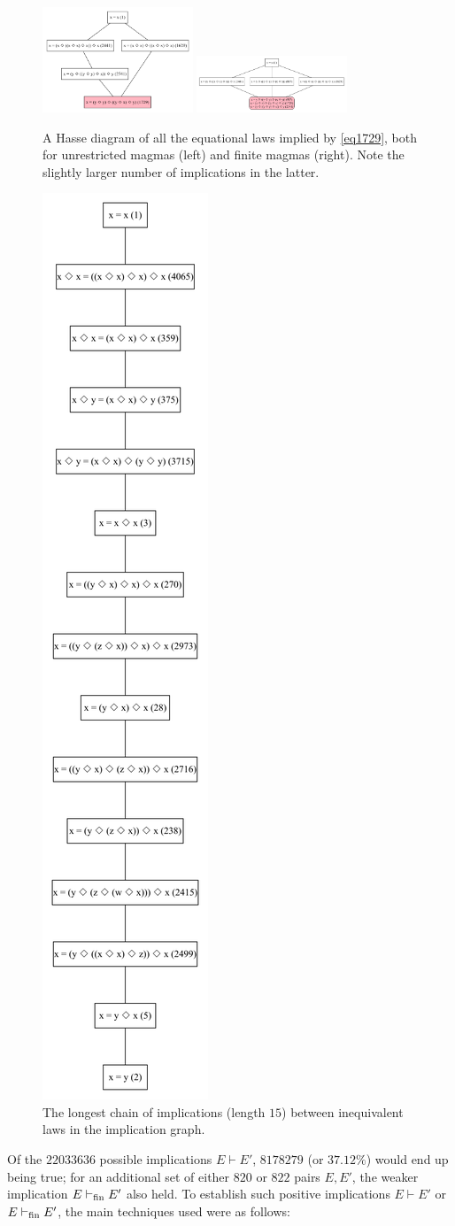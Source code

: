 \begin{figure}
    \centering
    \includegraphics[width=0.4\textwidth]{ramanujan-infinite.png}
    \includegraphics[width=0.4\textwidth]{ramanujan-finite.png}
    \caption{A Hasse diagram of all the equational laws implied by \eqref{eq1729}, both for unrestricted magmas (left) and finite magmas (right). Note the slightly larger number of implications in the latter.}
    \label{fig:1729}
\end{figure}

\begin{figure}
    \centering
    \includegraphics[height=4 in]{longchain.png}
    \caption{The longest chain of implications (length $15$) between inequivalent laws in the implication graph.}
    \label{fig:longchain}
\end{figure}

Of the $\num{22033636}$ possible implications $E \vdash E'$, $8178279$ (or $37.12\%$) would end up being true; for an additional set of either $820$ or $822$ pairs $E,E'$, the weaker implication $E \vdash_{\mathrm{fin}} E'$ also held. To establish such positive implications $E \vdash E'$ or $E \vdash_{\mathrm{fin}} E'$, the main techniques used were as follows:

